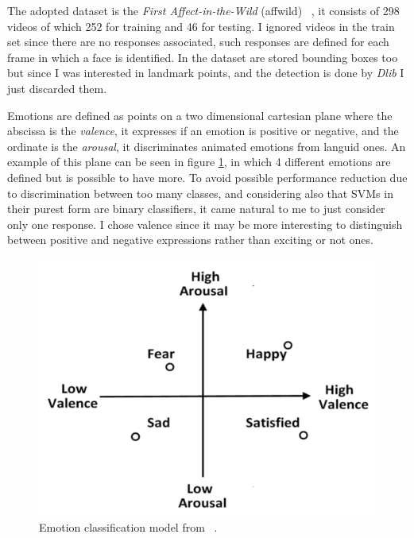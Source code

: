 The adopted dataset is the \textit{First Affect-in-the-Wild} (affwild) ~\cite{dataset:affwild}, it consists of 298 videos of which 252 for training and 46 for testing.
I ignored videos in the train set since there are no responses associated, such responses are defined for each frame in which a face is identified.
In the dataset are stored bounding boxes too but since I was interested in landmark points, and the detection is done by \textit{Dlib} I just discarded them.

Emotions are defined as points on a two dimensional cartesian plane where the abscissa is the \textit{valence}, it expresses if an emotion is positive or negative, and the ordinate is the \textit{arousal}, it discriminates animated emotions from languid ones.
An example of this plane can be seen in figure \ref{fig:emotion_classification}, in which 4 different emotions are defined but is possible to have more.
To avoid possible performance reduction due to discrimination between too many classes, and considering also that SVMs in their purest form are binary classifiers, it came natural to me to just consider only one response.
I chose valence since it may be more interesting to distinguish between positive and negative expressions rather than exciting or not ones.

\begin{figure}[h!t]
    \centering
    \includegraphics[scale=0.45]{images/emotion-classification.png}
    \caption{Emotion classification model from ~\cite{emotion_classification}.}
    \label{fig:emotion_classification}
\end{figure}
